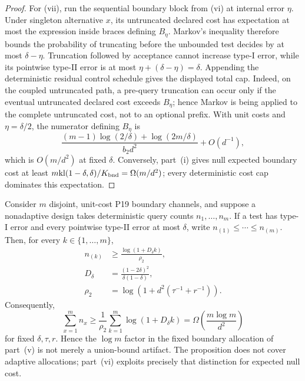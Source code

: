\begin{proof}
For (vii), run the sequential boundary block from (vi) at internal error
\(\eta\).  Under singleton alternative \(x\), its untruncated declared cost
has expectation at most the expression inside braces defining \(B_\eta\).
Markov's inequality therefore bounds the probability of truncating before the
unbounded test decides by at most \(\delta-\eta\).  Truncation followed by
acceptance cannot increase type-I error, while its pointwise type-II error is
at most \(\eta+(\delta-\eta)=\delta\).  Appending the deterministic residual
control schedule gives the displayed total cap.  Indeed, on the coupled
untruncated path, a pre-query truncation can occur only if the eventual
untruncated declared cost exceeds \(B_\eta\); hence Markov is being applied to
the complete untruncated cost, not to an optional prefix.  With unit costs and
\(\eta=\delta/2\), the numerator defining \(B_\eta\) is
\begin{equation}\label{eq:formal-results-072}
\frac{(m-1)\log(2/\delta)+\log(2m/\delta)}{b_2d^2}
+O(d^{-1}),
\end{equation}
which is \(O(m/d^2)\) at fixed \(\delta\).  Conversely, part~(i) gives null
expected boundary cost at least
\(m\mathrm{kl}(1-\delta,\delta)/K_{\rm bnd}=\Omega(m/d^2)\); every deterministic cost
cap dominates this expectation.
\end{proof}




\begin{proposition}
\label{prop:boundary-familywise-fixed}
Consider \(m\) disjoint, unit-cost P19 boundary channels, and suppose a
nonadaptive design takes deterministic query counts \(n_1,\ldots,n_m\).
If a test has type-I error and every pointwise type-II error at most
\(\delta\), write \(n_{(1)}\le\cdots\le n_{(m)}\).  Then, for every
\(k\in\{1,\ldots,m\}\),
\begin{equation}\label{eq:formal-results-073}
\begin{aligned}
n_{(k)}&\ge\frac{\log(1+D_\delta k)}{\rho_2},\\
D_\delta&=\frac{(1-2\delta)^2}{\delta(1-\delta)},\\
\rho_2&=\log\!\left(1+d^2(\tau^{-1}+r^{-1})\right).
\end{aligned}
\end{equation}
Consequently,
\begin{equation}\label{eq:formal-results-074}
\sum_{x=1}^m n_x
\ge
\frac1{\rho_2}\sum_{k=1}^m\log(1+D_\delta k)
=\Omega\!\left(\frac{m\log m}{d^2}\right)
\end{equation}
for fixed \(\delta,\tau,r\).  Hence the \(\log m\) factor in the fixed
boundary allocation of part~(v) is not merely a union-bound artifact.  The
proposition does not cover adaptive allocations; part~(vi) exploits precisely
that distinction for expected null cost.
\end{proposition}


